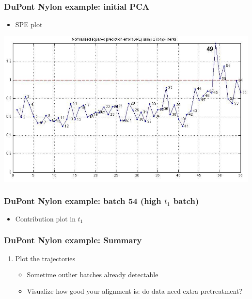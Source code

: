 \begin{frame}\frametitle{DuPont Nylon example: initial PCA}
	\begin{itemize}
		\item	SPE plot
	\end{itemize}
	
	\begin{center}
		\includegraphics[width=\textwidth]{images/dupont/dupont-raw-SPE.jpg}
	\end{center}
\end{frame}

\begin{frame}\frametitle{DuPont Nylon example: batch 54 (high \( t_1 \) batch)}
	\begin{itemize}
		\item	Contribution plot in \( t_1 \)
	\end{itemize}
	
	\begin{center}
	\end{center}
\end{frame}

\begin{frame}\frametitle{DuPont Nylon example: Summary}
	
\begin{enumerate}
	\item	Plot the trajectories
	
			\begin{itemize}
				\item	Sometime outlier batches already detectable
				
				\item	Visualize how good your alignment is: do data need extra pretreatment?
			\end{itemize}
\end{enumerate}


	
\end{frame}

